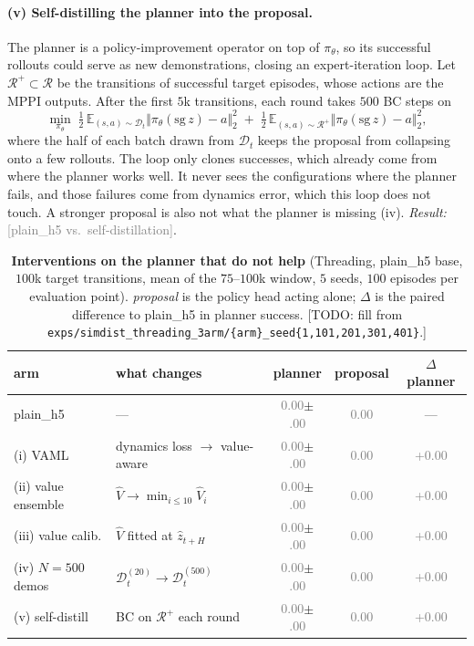 \documentclass{article} %
\newcommand{\ph}[1]{\textcolor{gray}{#1}}   %
\newcommand{\pmsd}[1]{{\scriptsize$\pm$#1}}      %
\begin{document}
\paragraph{(v) Self-distilling the planner into the proposal.}
The planner is a policy-improvement operator on top of $\pi_\theta$, so its
successful rollouts could serve as new demonstrations, closing an expert-iteration
loop. Let $\mathcal{R}^{+}\subset\mathcal{R}$ be the transitions of successful
target episodes, whose actions are the MPPI outputs. After the first $5$k
transitions, each round takes $500$ BC steps on
\begin{equation}
\min_{\pi_\theta}\;
\tfrac12\,\mathbb{E}_{(s,a)\sim\mathcal{D}_t}\big\Vert \pi_\theta(\mathrm{sg}\,z) - a\big\Vert_2^2
\;+\; \tfrac12\,\mathbb{E}_{(s,a)\sim\mathcal{R}^{+}}\big\Vert \pi_\theta(\mathrm{sg}\,z) - a\big\Vert_2^2 ,
\end{equation}
where the half of each batch drawn from $\mathcal{D}_t$ keeps the proposal from
collapsing onto a few rollouts. The loop only clones successes, which already come
from where the planner works well. It never sees the configurations where the
planner fails, and those failures come from dynamics error, which this loop does
not touch. A stronger proposal is also not what the planner is missing (iv).
\emph{Result:} \ph{[plain\_h5 vs.\ self-distillation]}.

\begin{table}[h]
\centering
\caption{%
  \textbf{Interventions on the planner that do not help} (Threading, plain\_h5 base,
  $100$k target transitions, mean of the $75$--$100$k window, $5$ seeds,
  $100$ episodes per evaluation point). \emph{proposal} is the policy head acting
  alone; $\Delta$ is the paired difference to plain\_h5 in planner success.
  [TODO: fill from \texttt{exps/simdist\_threading\_3arm/\{arm\}\_seed\{1,101,201,301,401\}}.]
}
\label{tab:app-negative}
\begin{tabular}{llccc}
\toprule
arm & what changes & planner & proposal & $\Delta$ planner \\
\midrule
plain\_h5            & ---                                        & \ph{0.00}\pmsd{\ph{.00}} & \ph{0.00} & --- \\
(i) VAML             & dynamics loss $\to$ value-aware            & \ph{0.00}\pmsd{\ph{.00}} & \ph{0.00} & \ph{+0.00} \\
(ii) value ensemble  & $\hat V \to \min_{i\le10} \hat V_i$        & \ph{0.00}\pmsd{\ph{.00}} & \ph{0.00} & \ph{+0.00} \\
(iii) value calib.   & $\hat V$ fitted at $\hat z_{t+H}$          & \ph{0.00}\pmsd{\ph{.00}} & \ph{0.00} & \ph{+0.00} \\
(iv) $N{=}500$ demos & $\mathcal{D}_t^{(20)} \to \mathcal{D}_t^{(500)}$ & \ph{0.00}\pmsd{\ph{.00}} & \ph{0.00} & \ph{+0.00} \\
(v) self-distill     & BC on $\mathcal{R}^{+}$ each round         & \ph{0.00}\pmsd{\ph{.00}} & \ph{0.00} & \ph{+0.00} \\
\bottomrule
\end{tabular}
\end{table}
\end{document}

